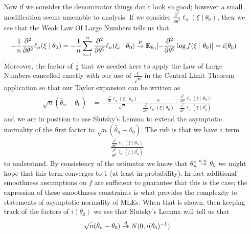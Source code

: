 Now if we consider the denominator things don't look so good; however a small
modification seems amenable to analysis.  If we consider
$\frac{\partial^2}{\partial \theta^2}\ell_n (\xi \mid \theta_0)$, then
we see that the Weak Law Of Large Numbers tells us that
\begin{align*}
-\frac{1}{n}\frac{\partial^2}{\partial \theta^2}\ell_n (\xi \mid \theta_0) &=
-\frac{1}{n}\sum_{i=1}^n \frac{\partial^2}{\partial \theta^2}\ell_n (\xi_i \mid
\theta_0)  \toprob \sexpectation{-\frac{\partial^2}{\partial \theta^2}
  \log f (\xi \mid
\theta_0) }{\theta_0} =  i(\theta_0)
\end{align*}
Moreover, the factor of $\frac{1}{n}$ that we needed here to apply the
Law of Large Numbers
cancelled exactly with our use of $\frac{1}{\sqrt{n}}$ in the Central
Limit Theorem application so that our Taylor expansion can be written as
\begin{align*}
\sqrt{n}(\hat{\theta}_n - \theta_0) &=
-\frac{
 \frac{\partial}{\partial \theta} \ell_n (\xi \mid
  \theta_0)}{\sqrt{n}} \cdot 
\frac{n}{\frac{\partial^2}{\partial
    \theta^2}\ell_n (\xi \mid \theta_0)} \cdot
\frac {\frac{\partial^2}{\partial
    \theta^2}\ell_n (\xi \mid \theta_0)}
{\frac{\partial^2}{\partial \theta^2}\ell_n (\xi \mid \theta^*_n)} 
\end{align*}
and we are in position to use Slutsky's Lemma to extend the asymptotic
normality of the first factor to $\sqrt{n}(\hat{\theta}_n - \theta_0)$.
The rub is that we have
a term 
\begin{align*}
\frac{\frac{\partial^2}{\partial \theta^2}\ell_n (\xi \mid \theta_0) }{\frac{\partial^2}{\partial \theta^2}\ell_n (\xi \mid \theta_n^*) }
\end{align*}
to understand.  By consistency of the estimator we know that
$\theta_n^* \toas \theta_0$ we might hope that this term converges to
$1$ (at least in probability).  In fact additional smoothness
assumptions on $f$ are sufficient to guarantee that this is the case;
the expression of these smoothness constraints is what provides the
complexity to statements of asymptotic normality of MLEs.
When that is shown, then keeping track of the factors of $i(\theta_0)$
we see that Slutsky's Lemma will tell us that
\begin{align*}
\sqrt{n}(\hat{\theta}_n - \theta_0) \todist N(0, i(\theta_0)^{-1})
\end{align*}

